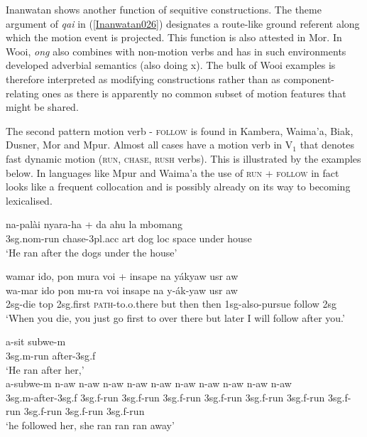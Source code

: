Inanwatan shows another function of sequitive constructions. The theme argument of \textit{qai} in (\ref{Inanwatan026}) designates a route-like ground referent along which the motion event is projected. This function is also attested in Mor. In Wooi, \textit{ong} also combines with non-motion verbs and has in such environments developed adverbial semantics (also doing x). The bulk of Wooi examples is therefore interpreted as modifying constructions rather than as component-relating ones as there is apparently no common subset of motion features that might be shared.

The second pattern motion verb - \textsc{follow} is found in Kambera, Waima'a, Biak, Dusner, Mor and Mpur. Almost all cases have a motion verb in V$_{1}$ that denotes fast dynamic motion (\textsc{run}, \textsc{chase}, \textsc{rush} verbs). This is illustrated by the examples below. In languages like Mpur and Waima'a the use of \textsc{run} + \textsc{follow} in fact looks like a frequent collocation and is possibly already on its way to becoming lexicalised.

\ea \label{Kambera003}
\gll na-palài nyara-ha + da ahu la mbomang \\
\acs{3}\acs{sg}.\acs{nom}-run chase-\acs{3}\acs{pl}.\acs{acc} \acs{art} dog \acs{loc} space under house \\
\glft `He ran after the dogs under the house' \\ 
\z
\xe

\ea \label{Biak005}
\gll wamar ido, pon mura voi + insape na yákyaw usr aw \\
wa-mar ido pon mu-ra voi insape na y-ák-yaw usr aw \\
\glc \acs{2}\acs{sg}-die \acs{top} \acs{2}\acs{sg}.first \textsc{path}-to.o.there but then then \acs{1}\acs{sg}-also-pursue follow \acs{2}\acs{sg} \\
\glft `When you die, you just go first to over there but later I will follow after you.' \\ 
\z
\xe

\pex 
\a \label{Mpur057a}
\gll a-sit subwe-m \\
\acs{3}\acs{sg}.\acs{m}-run after-\acs{3}\acs{sg}.\acs{f} \\
\glft `He ran after her,' \\ 
\z
\a \label{Mpur057b}
\gll a-subwe-m n-aw n-aw n-aw n-aw n-aw n-aw n-aw n-aw n-aw n-aw \\ 
\acs{3}\acs{sg}.\acs{m}-after-\acs{3}\acs{sg}.\acs{f} \acs{3}\acs{sg}.\acs{f}-run \acs{3}\acs{sg}.\acs{f}-run \acs{3}\acs{sg}.\acs{f}-run \acs{3}\acs{sg}.\acs{f}-run \acs{3}\acs{sg}.\acs{f}-run \acs{3}\acs{sg}.\acs{f}-run \acs{3}\acs{sg}.\acs{f}-run \acs{3}\acs{sg}.\acs{f}-run \acs{3}\acs{sg}.\acs{f}-run \acs{3}\acs{sg}.\acs{f}-run\\
\glft `he followed her, she ran ran ran away' \\ 
\z
\xe

